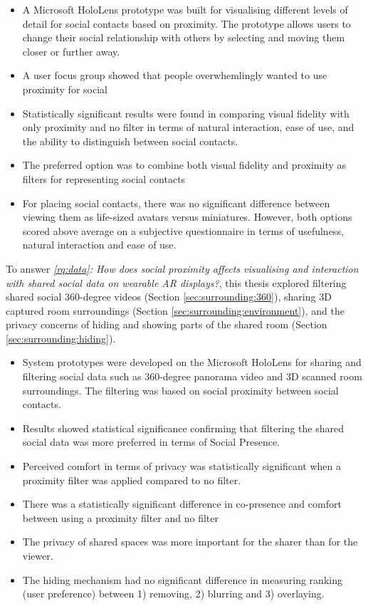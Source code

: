 \begin{itemize}
    \item{A Microsoft HoloLens prototype was built for visualising different levels of detail for social contacts based on proximity. The prototype allows users to change their social relationship with others by selecting and moving them closer or further away.}
    \item{A user focus group showed that people overwhemlingly wanted to use proximity for social }
    \item{Statistically significant results were found in comparing visual fidelity with only proximity and no filter in terms of natural interaction, ease of use, and the ability to distinguish between social contacts.}
    \item{The preferred option was to combine both visual fidelity and proximity as filters for representing social contacts}
    \item{For placing social contacts, there was no significant difference between viewing them as life-sized avatars versus miniatures. However, both options scored above average on a subjective questionnaire in terms of usefulness, natural interaction and ease of use.}
\end{itemize}

\noindent
To answer \textit{\ref{rq:data}: How does social proximity affects visualising and interaction with shared social data on wearable AR displays?}, this thesis explored filtering shared social 360-degree videos (Section \ref{sec:surrounding:360}), sharing 3D captured room surroundings (Section \ref{sec:surrounding:environment}), and the privacy concerns of hiding and showing parts of the shared room (Section \ref{sec:surrounding:hiding}). 

\begin{itemize}
    \item{System prototypes were developed on the Microsoft HoloLens for sharing and filtering social data such as 360-degree panorama video and 3D scanned room surroundings. The filtering was based on social proximity between social contacts.}
    \item{Results showed statistical significance confirming that filtering the shared social data was more preferred in terms of Social Presence.}
    \item{Perceived comfort in terms of privacy was statistically significant when a proximity filter was applied compared to no filter.}
    \item{There was a statistically significant difference in co-presence and comfort between using a proximity filter and no filter}
    \item{The privacy of shared spaces was more important for the sharer than for the viewer.}
    \item{The hiding mechanism had no significant difference in measuring ranking (user preference) between 1) removing, 2) blurring and 3) overlaying.}
\end{itemize}

